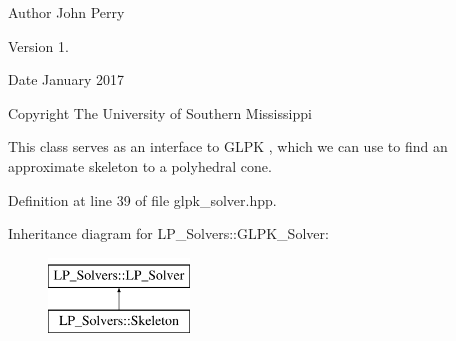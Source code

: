 \begin{DoxyAuthor}{Author}
John Perry 
\end{DoxyAuthor}
\begin{DoxyVersion}{Version}
1. 
\end{DoxyVersion}
\begin{DoxyDate}{Date}
January 2017 
\end{DoxyDate}
\begin{DoxyCopyright}{Copyright}
The University of Southern Mississippi
\end{DoxyCopyright}
This class serves as an interface to G\+L\+PK \cite{glpk}, which we can use to find an approximate skeleton to a polyhedral cone. 

Definition at line 39 of file glpk\+\_\+solver.\+hpp.

Inheritance diagram for L\+P\+\_\+\+Solvers\+:\+:G\+L\+P\+K\+\_\+\+Solver\+:\begin{figure}[H]
\begin{center}
\leavevmode
\includegraphics[height=2.000000cm]{group___c_l_s_solvers}
\end{center}
\end{figure}

